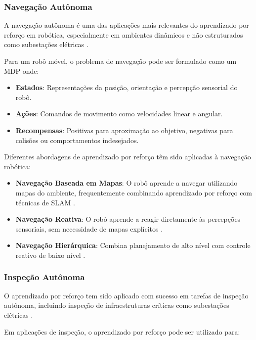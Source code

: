 \subsubsection{Navegação Autônoma}

A navegação autônoma é uma das aplicações mais relevantes do aprendizado por reforço em robótica, especialmente em ambientes dinâmicos e não estruturados como subestações elétricas \cite{Faria2002}.

Para um robô móvel, o problema de navegação pode ser formulado como um MDP onde:

\begin{itemize}
    \item \textbf{Estados}: Representações da posição, orientação e percepção sensorial do robô.
    \item \textbf{Ações}: Comandos de movimento como velocidades linear e angular.
    \item \textbf{Recompensas}: Positivas para aproximação ao objetivo, negativas para colisões ou comportamentos indesejados.
\end{itemize}

Diferentes abordagens de aprendizado por reforço têm sido aplicadas à navegação robótica:

\begin{itemize}
    \item \textbf{Navegação Baseada em Mapas}: O robô aprende a navegar utilizando mapas do ambiente, frequentemente combinando aprendizado por reforço com técnicas de SLAM \cite{Tai2017}.
    \item \textbf{Navegação Reativa}: O robô aprende a reagir diretamente às percepções sensoriais, sem necessidade de mapas explícitos \cite{Zhu2017}.
    \item \textbf{Navegação Hierárquica}: Combina planejamento de alto nível com controle reativo de baixo nível \cite{Kulkarni2016}.
\end{itemize}

\subsubsection{Inspeção Autônoma}

O aprendizado por reforço tem sido aplicado com sucesso em tarefas de inspeção autônoma, incluindo inspeção de infraestruturas críticas como subestações elétricas \cite{Tai2024AutonomousRL}.

Em aplicações de inspeção, o aprendizado por reforço pode ser utilizado para:

